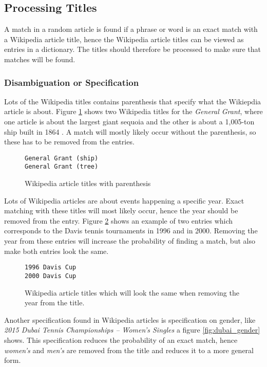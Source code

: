 \subsection{Processing Titles}
A match in a random article is found if a phrase or word is an exact match with a Wikipedia article title, hence the Wikipedia article titles can be viewed as entries in a dictionary. The titles should therefore be processed to make sure that matches will be found. 

\subsubsection{Disambiguation or Specification}
Lots of the Wikipedia titles contains parenthesis that specify what the Wikiepdia article is about. Figure \ref{fig:parenthesis_example} shows two Wikipedia titles for the \emph{General Grant}, where one article is about the largest giant sequoia \cite{wiki:generalgranttree} and the other is about a 1,005-ton ship built in 1864 \cite{wiki:generalgrantship}. A match will mostly likely occur without the parenthesis, so these has to be removed from the entries. 

\begin{figure}[h]
\centering
\begin{lstlisting}
General Grant (ship)
General Grant (tree)
\end{lstlisting}
\caption{Wikipedia article titles with parenthesis}
\label{fig:parenthesis_example}
\end{figure}

Lots of Wikipedia articles are about events happening a specific year. Exact matching with these titles will most likely occur, hence the year should be removed from the entry.  Figure \ref{fig:davis_cups} shows an example of two entries which corresponds to the Davis tennis tournaments in 1996 and in 2000. Removing the year from these entries will increase the probability of finding a match, but also make both entries look the same. 

\begin{figure}[h]
\centering
\begin{lstlisting}
1996 Davis Cup
2000 Davis Cup
\end{lstlisting}
\caption{Wikipedia article titles which will look the same when removing the year from the title.}
\label{fig:davis_cups}
\end{figure}

Another specification found in Wikipedia articles is specification on gender, like \emph{2015 Dubai Tennis Championships – Women's Singles} a figure \ref{fig:dubai_gender} shows. This specification reduces the probability of an exact match, hence \emph{women's} and \emph{men's} are removed from the title and reduces it to a more general form. 

